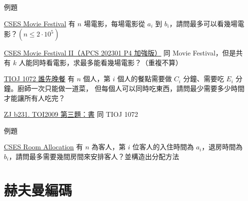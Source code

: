 \documentclass[aspectratio=169]{beamer}
\begin{document}
    \begin{frame}{例題}
        \begin{block}{\href{https://cses.fi/problemset/task/1629}{CSES Movie Festival}}
            有 $n$ 場電影，每場電影從 $a_i$ 到 $b_i$，請問最多可以看幾場電影？$(n \le 2 \cdot 10^5)$
        \end{block}

        \begin{block}{\href{https://cses.fi/problemset/task/1632/}{CSES Movie Festival II（APCS 202301 P4 加強版）}}
            同 Movie Festival，但是共有 $k$ 人能同時看電影，求最多能看幾場電影？（重複不算）
        \end{block}

        \begin{block}{\href{https://tioj.ck.tp.edu.tw/problems/1072}{TIOJ 1072 誰先晚餐}}
            有 $n$ 個人，第 $i$ 個人的餐點需要做 $C_i$ 分鐘、需要吃 $E_i$ 分鐘。廚師一次只能做一道菜，
            但每個人可以同時吃東西，請問最少需要多少時間才能讓所有人吃完？
        \end{block}

        \begin{block}{\href{https://zerojudge.tw/ShowProblem?problemid=b231}{ZJ b231. TOI2009 第三題：書}}
            同 TIOJ 1072
        \end{block}
    \end{frame}

    \begin{frame}{例題}
        \begin{block}{\href{https://cses.fi/problemset/task/1164/}{CSES Room Allocation}}
            有 $n$ 為客人，第 $i$ 位客人的入住時間為 $a_i$，退房時間為 $b_i$，請問最多需要幾間房間來安排客人？並構造出分配方法
        \end{block}
    \end{frame}

    \section{赫夫曼編碼}
\end{document}
